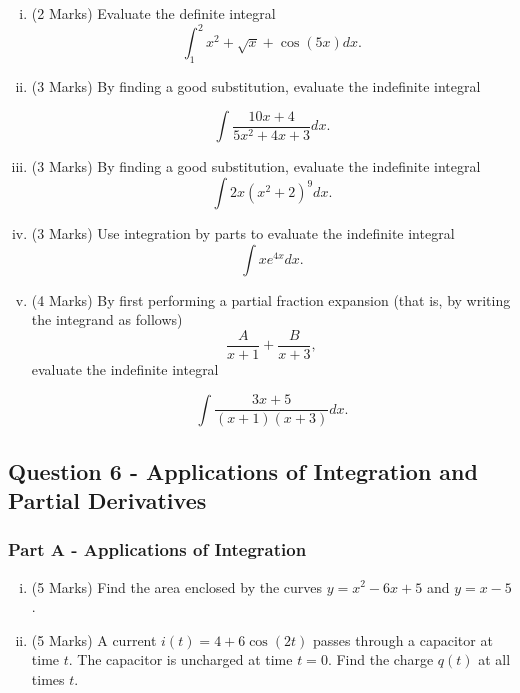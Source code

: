 ﻿ \documentclass[a4paper,12pt]{article}
\begin{document}

\begin{enumerate}[(i)]
	\item (2 Marks)  Evaluate the definite integral
	\[ \int^2_1 x^2 + \sqrt{x} + \cos(5x) dx. \]
	\item (3 Marks) By finding a good substitution, evaluate the indefinite integral

  \[ \int \frac{10x + 4}{5x^2 + 4x + 3} dx.\]
	
	\item (3 Marks) By finding a good substitution, evaluate the indefinite integral
	\[ \int 2x(x^2 + 2)^9 dx.\]
	\item (3 Marks) Use integration by parts to evaluate the indefinite integral
	\[ \int  xe^{4x} dx. \]
	\item (4 Marks) By first performing a partial fraction expansion (that is, by writing the integrand
	as follows)
	\[  \frac{A}{x + 1} + \frac{B}{x + 3},
	\]evaluate the indefinite integral

	\[ \int \frac{3x + 5}{(x + 1)(x + 3)}  dx. \]

\end{enumerate}

\newpage
\subsection*{Question 6  - Applications of Integration and Partial Derivatives}

\subsubsection*{Part A - Applications of Integration}
\begin{enumerate}[(i)]
	\item (5 Marks) Find the area enclosed by the curves $y=x^2-6x+5$ and $y=x-5$.
\item (5 Marks) A current $i(t) = 4 + 6\cos(2t)$ passes through a capacitor at time $t$.
The capacitor is uncharged at time $ t = 0 $. Find the charge $q(t)$ at all times $t$.
%
\end{enumerate}
\end{document}
